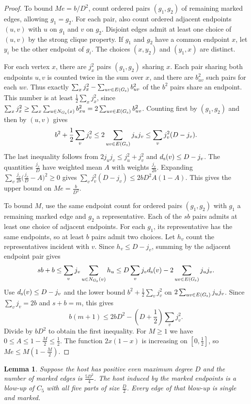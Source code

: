 \documentclass[preprint,11pt,numbers]{elsarticle-arxiv}
\numberwithin{equation}{section}
\newtheorem{lemma}[theorem]{Lemma}
\theoremstyle{definition}
\begin{document}
\begin{proof}
To bound $Me=b/D^2$, count ordered pairs $(g_1,g_2)$ of remaining
marked edges, allowing $g_1=g_2$. For each pair, also count ordered
adjacent endpoints $(u,v)$ with $u$ on $g_1$ and $v$ on $g_2$.
Disjoint edges admit at least one choice of $(u,v)$ by the
strong clique property. If $g_1$ and $g_2$ have a common endpoint
$x$, let $y_i$ be the other endpoint of $g_i$. The choices
$(x,y_2)$ and $(y_1,x)$ are distinct.

For each vertex $x$, there are $j_x^2$ pairs $(g_1,g_2)$ sharing $x$.
Each pair sharing both endpoints $u,v$ is counted twice in the sum
over $x$, and there are $b_{uv}^2$ such pairs for each $uv$.
Thus exactly $\sum_x j_x^2-\sum_{uv\in E(G_{\rm s})}b_{uv}^2$
of the $b^2$ pairs share an endpoint. This number is at least
$\frac12\sum_x j_x^2$, since
$\sum_x j_x^2\geq\sum_x\sum_{u\in N_{G_{\rm s}}(x)}b_{xu}^2
=2\sum_{uv\in E(G_{\rm s})}b_{uv}^2$.
Counting first by $(g_1,g_2)$ and then by $(u,v)$ gives
\[
 b^2+\frac{1}{2}\sum_v j_v^2
 \le 2\sum_{uv\in E(G_{\rm s})}j_uj_v
 \le \sum_v j_v^2(D-j_v).
\]
The last inequality follows from $2j_uj_v\le j_u^2+j_v^2$ and
$d_{\rm s}(v)\le D-j_v$. The quantities $\frac{j_v}{D}$ have
weighted mean $A$ with weights $\frac{j_v}{2b}$. Expanding
$\sum_v \frac{j_v}{2b}\bigl(\frac{j_v}{D}-A\bigr)^2\geq0$
gives $\sum_v j_v^2(D-j_v)\le 2bD^2A(1-A)$.
This gives the upper bound on $Me=\frac{b}{D^2}$.

To bound $M$, use the same endpoint count for ordered pairs
$(g_1,g_2)$ with $g_1$ a remaining marked edge and $g_2$ a
representative. Each of the $sb$ pairs admits at least one
choice of adjacent endpoints. For each $g_1$, its representative
has the same endpoints, so at least $b$ pairs admit two choices.
Let $h_v$ count the representatives incident with $v$. Since
$h_v\leq D-j_v$, summing by the adjacent endpoint pair gives
\[
 sb+b\le \sum_v j_v\sum_{u\in N_{G_{\rm s}}(v)} h_u
 \le D\sum_v j_v d_{\rm s}(v)-2\sum_{uv\in E(G_{\rm s})}j_uj_v.
\]
Use $d_{\rm s}(v)\leq D-j_v$ and the lower bound
$b^2+\frac12\sum_v j_v^2$ on $2\sum_{uv\in E(G_{\rm s})}j_uj_v$.
Since $\sum_v j_v=2b$ and $s+b=m$, this gives
\[
 b(m+1)\le 2bD^2-\left(D+\frac{1}{2}\right)\sum_v j_v^2.
\]
Divide by $bD^2$ to obtain the first inequality. For $M\ge1$ we
have $0\le A\le 1-\frac{M}{2}\le\frac{1}{2}$. The function $2x(1-x)$ is
increasing on $[0,\frac{1}{2}]$, so $Me\le M(1-\frac{M}{2})$.
\end{proof}

\begin{lemma}\label{lem:multi-even-equality}
Suppose the host has positive even maximum degree $D$ and the
number of marked edges is $\frac{5D^2}{4}$. The host induced by
the marked endpoints is a blow-up of $C_5$ with all five parts of
size $\frac{D}{2}$. Every edge of that blow-up is single and marked.
\end{lemma}
\end{document}
